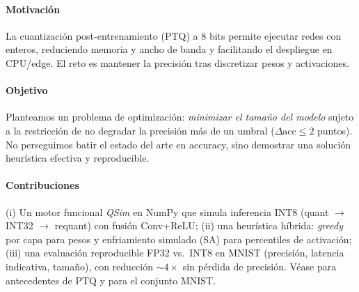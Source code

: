 \paragraph{Motivación}
La cuantización post-entrenamiento (PTQ) a 8 bits permite ejecutar redes con enteros, reduciendo memoria y ancho de banda y facilitando el despliegue en CPU/edge. El reto es mantener la precisión tras discretizar pesos y activaciones.

\paragraph{Objetivo}
Planteamos un problema de optimización: \emph{minimizar el tamaño del modelo} sujeto a la restricción de no degradar la precisión más de un umbral ($\Delta\mathrm{acc}\leq 2$ puntos). No perseguimos batir el estado del arte en accuracy, sino demostrar una solución heurística efectiva y reproducible.

\paragraph{Contribuciones}
(i) Un motor funcional \emph{QSim} en NumPy que simula inferencia INT8 (quant $\rightarrow$ INT32 $\rightarrow$ requant) con fusión Conv+ReLU; (ii) una heurística híbrida: \emph{greedy} por capa para pesos y enfriamiento simulado (SA) para percentiles de activación; (iii) una evaluación reproducible FP32 vs.\ INT8 en MNIST (precisión, latencia indicativa, tamaño), con reducción $\sim 4\times$ sin pérdida de precisión.
Véase \citep{Jacob2018CVPR,Krishnamoorthi2018Whitepaper} para antecedentes de PTQ y \citep{LeCun1998ProcIEEE,MNIST} para el conjunto MNIST.
